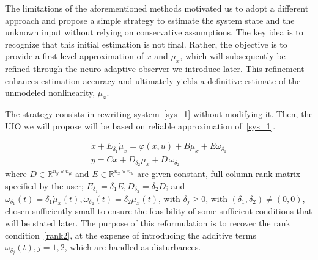 The limitations of the aforementioned methods motivated us to adopt a different approach and propose a simple strategy to estimate the system state and the unknown input without relying on conservative assumptions. The key idea is to recognize that this initial estimation is not final. Rather, the objective is to provide a first-level approximation of $x$ and $\mu_{x}$, which will subsequently be refined through the neuro-adaptive observer we introduce later. This refinement enhances estimation accuracy and ultimately yields a definitive estimate of the unmodeled nonlinearity, $\mu_{x}$.


The strategy consists in rewriting system~\eqref{sys_1} without modifying it. Then, the UIO we will propose will be based on reliable approximation of~\eqref{sys_1}.

\begin{equation}\label{ali_syst1}
    \begin{array}{l}
        \dot{x} + E_{\delta_1} \dot{\mu}_{x} = \varphi(x,u) + B\mu_{x} + E \omega_{\delta_{1}} \\
        y = Cx + D_{\delta_2} \mu_{x} + D\, \omega_{\delta_{2}} 
    \end{array}
\end{equation}
where $D \in \mathbb{R}^{n_y \times n_{\mu}}$ and $E \in \mathbb{R}^{n_x \times n_{\mu}}$ are given constant, full-column-rank matrix specified by the user; $E_{\delta_1} = \delta_{1} E, D_{\delta_2} = \delta_{2} D$; and $\omega_{\delta_{1}}(t) = \delta_{1} \dot{\mu}_{x}(t), \omega_{\delta_{2}}(t) = \delta_{2} \mu_{x}(t)$, with $\delta_{j} \geq 0$, with $(\delta_1,\delta_2) \neq (0,0)$, chosen sufficiently small to ensure the feasibility of some sufficient conditions that will be stated later. The purpose of this reformulation is to recover the rank condition~\eqref{rank2}, at the expense of introducing the additive terms $\omega_{\delta_{j}}(t), j=1,2$, which are handled as disturbances. 

